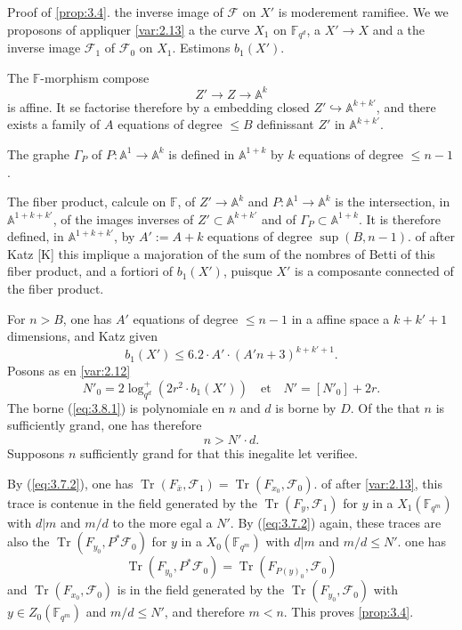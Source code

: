 \documentclass[11pt,a4paper]{article}
\theoremstyle{plain}
\theoremstyle{definition}
\DeclareMathOperator{\tr}{Tr}
\begin{document}
Proof of \ref{prop:3.4}. the inverse image of $\mathcal{F}$ on $X'$ is moderement ramifiee. We we proposons of appliquer \ref{var:2.13} a the curve $X_1$ on $\mathbb{F}_{q^d}$, a $X' \to X$ and a the inverse image $\mathcal{F}_1$ of $\mathcal{F}_0$ on $X_1$. Estimons $b_1(X')$.

The $\mathbb{F}$-morphism compose
\[
Z' \to Z \to \mathbb{A}^k
\]
is affine. It se factorise therefore by a embedding closed $Z' \hookrightarrow \mathbb{A}^{k+k'}$, and there exists a family of $A$ equations of degree $\leq B$ definissant $Z'$ in $\mathbb{A}^{k+k'}$.

The graphe $\Gamma_P$ of $P: \mathbb{A}^1 \to \mathbb{A}^k$ is defined in $\mathbb{A}^{1+k}$ by $k$ equations of degree $\leq n-1$.

The fiber product, calcule on $\mathbb{F}$, of $Z' \to \mathbb{A}^k$ and $P: \mathbb{A}^1 \to \mathbb{A}^k$ is the intersection, in $\mathbb{A}^{1+k+k'}$, of the images inverses of $Z' \subset \mathbb{A}^{k+k'}$ and of $\Gamma_P \subset \mathbb{A}^{1+k}$. It is therefore defined, in $\mathbb{A}^{1+k+k'}$, by $A' := A+k$ equations of degree $\sup(B, n-1)$. of after Katz [K] this implique a majoration of the sum of the nombres of Betti of this fiber product, and a fortiori of $b_1(X')$, puisque $X'$ is a composante connected of the fiber product.

For $n > B$, one has $A'$ equations of degree $\leq n-1$ in a affine space a $k+k'+1$ dimensions, and Katz given
\begin{equation}\label{eq:3.8.1}
b_1(X') \leq 6.2 \cdot A' \cdot (A'n+3)^{k+k'+1}.
\end{equation}
Posons as en \ref{var:2.12}
\[
N'_0 = 2\log_{q^d}^+(2r^2 \cdot b_1(X')) \quad \text{et} \quad N' = [N'_0] + 2r.
\]
The borne (\ref{eq:3.8.1}) is polynomiale en $n$ and $d$ is borne by $D$. Of the that $n$ is sufficiently grand, one has therefore
\[
n > N' \cdot d.
\]
Supposons $n$ sufficiently grand for that this inegalite let verifiee.

By (\ref{eq:3.7.2}), one has $\tr(F_{\bar{x}}, \mathcal{F}_1) = \tr(F_{x_0}, \mathcal{F}_0)$. of after \ref{var:2.13}, this trace is contenue in the field generated by the $\tr(F_y, \mathcal{F}_1)$ for $y$ in a $X_1(\mathbb{F}_{q^m})$ with $d|m$ and $m/d$ to the more egal a $N'$. By (\ref{eq:3.7.2}) again, these traces are also the $\tr(F_{y_0}, P^*\mathcal{F}_0)$ for $y$ in a $X_0(\mathbb{F}_{q^m})$ with $d|m$ and $m/d \leq N'$. one has
\[
\tr(F_{y_0}, P^*\mathcal{F}_0) = \tr(F_{P(y)_0}, \mathcal{F}_0)
\]
and $\tr(F_{x_0}, \mathcal{F}_0)$ is in the field generated by the $\tr(F_{y_0}, \mathcal{F}_0)$ with $y \in Z_0(\mathbb{F}_{q^m})$ and $m/d \leq N'$, and therefore $m < n$. This proves \ref{prop:3.4}.
\end{document}
